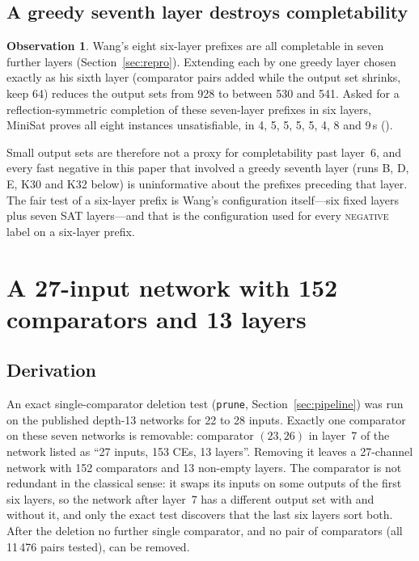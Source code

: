 \documentclass[11pt,a4paper]{article}
\theoremstyle{plain}
\theoremstyle{definition}
\newtheorem{observation}{Observation}
\theoremstyle{remark}
\newcommand{\NEG}{\textsc{negative}}
\begin{document}
\subsection{A greedy seventh layer destroys completability}\label{sec:greedy7}

\begin{observation}\label{obs:greedy7}
Wang's eight six-layer prefixes are all completable in seven further layers (Section~\ref{sec:repro}). Extending each by one greedy layer chosen exactly as his sixth layer (comparator pairs added while the output set shrinks, keep 64) reduces the output sets from 928 to between 530 and 541. Asked for a reflection-symmetric completion of these seven-layer prefixes in six layers, MiniSat proves all eight instances unsatisfiable, in 4, 5, 5, 5, 5, 4, 8 and 9\,s ().
\end{observation}

Small output sets are therefore not a proxy for completability past layer~6, and every fast negative in this paper that involved a greedy seventh layer (runs B, D, E, K30 and K32 below) is uninformative about the prefixes preceding that layer. The fair test of a six-layer prefix is Wang's configuration itself---six fixed layers plus seven SAT layers---and that is the configuration used for every \NEG{} label on a six-layer prefix.

\section{A 27-input network with 152 comparators and 13 layers}\label{sec:n27}

\subsection{Derivation}

An exact single-comparator deletion test (\texttt{prune}, Section~\ref{sec:pipeline}) was run on the published depth-13 networks for 22 to 28 inputs. Exactly one comparator on these seven networks is removable: comparator $(23,26)$ in layer~7 of the network listed as ``27 inputs, 153 CEs, 13 layers''. Removing it leaves a 27-channel network with 152 comparators and 13 non-empty layers. The comparator is not redundant in the classical sense: it swaps its inputs on some outputs of the first six layers, so the network after layer~7 has a different output set with and without it, and only the exact test discovers that the last six layers sort both. After the deletion no further single comparator, and no pair of comparators (all 11\,476 pairs tested), can be removed.
\end{document}
